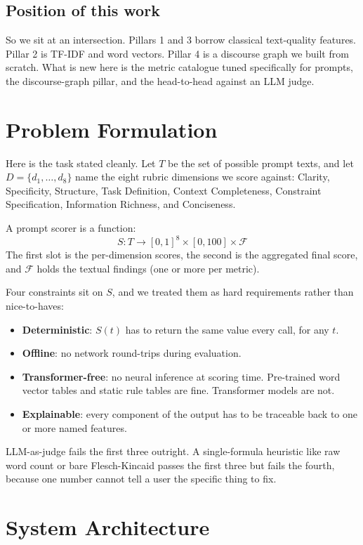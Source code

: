 \documentclass[conference]{IEEEtran}
\begin{document}
\subsection{Position of this work}
So we sit at an intersection. Pillars 1 and 3 borrow classical text-quality features. Pillar 2 is TF-IDF and word vectors. Pillar 4 is a discourse graph we built from scratch. What is new here is the metric catalogue tuned specifically for prompts, the discourse-graph pillar, and the head-to-head against an LLM judge.

\section{Problem Formulation}

Here is the task stated cleanly. Let $T$ be the set of possible prompt texts, and let $D = \{d_1, \ldots, d_8\}$ name the eight rubric dimensions we score against: Clarity, Specificity, Structure, Task Definition, Context Completeness, Constraint Specification, Information Richness, and Conciseness.

A prompt scorer is a function:
\[ S : T \to [0, 1]^8 \times [0, 100] \times \mathcal{F} \]
The first slot is the per-dimension scores, the second is the aggregated final score, and $\mathcal{F}$ holds the textual findings (one or more per metric).

Four constraints sit on $S$, and we treated them as hard requirements rather than nice-to-haves:
\begin{itemize}
\item \textbf{Deterministic}: $S(t)$ has to return the same value every call, for any $t$.
\item \textbf{Offline}: no network round-trips during evaluation.
\item \textbf{Transformer-free}: no neural inference at scoring time. Pre-trained word vector tables and static rule tables are fine. Transformer models are not.
\item \textbf{Explainable}: every component of the output has to be traceable back to one or more named features.
\end{itemize}

LLM-as-judge fails the first three outright. A single-formula heuristic like raw word count or bare Flesch-Kincaid passes the first three but fails the fourth, because one number cannot tell a user the specific thing to fix.

\section{System Architecture}
\end{document}
